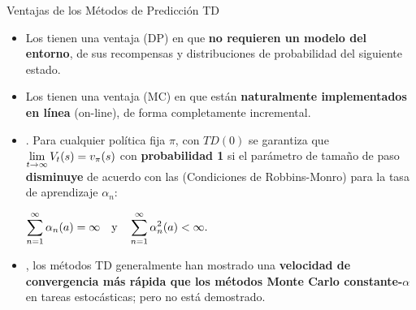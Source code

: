 \documentclass[10pt, envcountsect, handout, aspectratio=1610, hyperref={hypertexnames=true}]{beamer}
\begin{document}
\begin{frame}[label={frame:SizeParam}]{Ventajas de los Métodos de Predicción TD}
		
\begin{itemize}
	\item Los  tienen una ventaja  (DP) en que \textbf{no requieren un modelo del entorno}, de sus recompensas y distribuciones de probabilidad del siguiente estado.
	
	\item Los  tienen una ventaja  (MC) en que están \textbf{naturalmente implementados en línea} (on-line), de forma completamente incremental.
	
	\item {}. Para cualquier política fija \(\pi\), con \(TD(0)\) se garantiza que $\displaystyle \lim_{t \to \infty} V_t(s) = v_\pi(s)$  con \textbf{probabilidad 1} si el parámetro de tamaño de paso \textbf{disminuye} de acuerdo con las  (Condiciones de Robbins-Monro) para la tasa de aprendizaje $\alpha_n$:
	
	\centerline{$\displaystyle\sum_{n=1}^\infty \alpha_n(a) = \infty \quad \text{y} \quad \sum_{n=1}^\infty \alpha_n^2(a) < \infty.$}
	
	\item {}, los métodos TD generalmente han mostrado una \textbf{velocidad de convergencia más rápida que los métodos Monte Carlo constante-\(\alpha\)} en tareas estocásticas; pero no está demostrado.
\end{itemize}
\end{frame}




\end{document}
